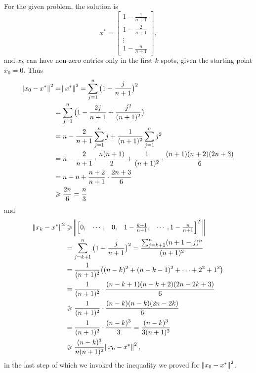 \documentclass[11pt]{article}
\begin{document}
\section{}
For the given problem, the solution is 
$$x^* = \begin{bmatrix}1-\frac1{n+1} \\ 1-\frac2{n+1} \\ \vdots \\ 1-\frac n{n+1}\end{bmatrix},$$
and $x_k$ can have non-zero entries only in the first $k$ spots, given the starting point $x_0 = 0$.
Thus
\begin{equation}\begin{split} 
\norm{x_0-x^*}^2 &= \norm{x^*}^2 = \sum_{j=1}^n\big(1 - \frac j{n+1} \big)^2 \\ 
&= \sum_{j=1}^n \big( 1 - \frac{2j}{n+1} + \frac{j^2}{(n+1)^2} \big) \\
&= n - \frac2{n+1}\sum_{j=1}^n j + \frac1{(n+1)^2}\sum_{j=1}^n j^2 \\
&= n - \frac2{n+1}\cdot \frac{n(n+1)}2 + \frac1{(n+1)^2}\cdot \frac{(n+1)(n+2)(2n+3)}6 \\
&= n - n + \frac{n+2}{n+1}\cdot\frac{2n+3}6 \\
&\geqslant \frac{2n}6 = \frac{n}3
\end{split}\nonumber\end{equation}  
and
\begin{equation}\begin{split} 
\norm{x_k-x^*}^2 &\geqslant \norm{\begin{bmatrix}0, & \cdots, & 0, & 1 - \frac{k+1}{n+1}, & \cdots, 1-\frac n{n+1} \end{bmatrix}^T } \\
&= \sum_{j=k+1}^n \big(1-\frac j{n+1} \big)^2 = \frac{\sum_{j=k+1}^n(n+1-j)^n}{(n+1)^2} \\
&= \frac1{(n+1)^2}\big((n-k)^2+(n-k-1)^2 + \cdots + 2^2 +1^2 \big)\\
&= \frac1{(n+1)^2}\cdot \frac{(n-k+1)(n-k+2)(2n-2k+3)}6 \\
&\geqslant \frac1{(n+1)^2}\cdot\frac{(n-k)(n-k)(2n-2k)}6 \\
&= \frac1{(n+1)^2}\cdot\frac{(n-k)^3}3 = \frac{(n-k)^3}{3(n+1)^2} \\
&\geqslant \frac{(n-k)^3}{n(n+1)^2}\norm{x_0-x^*}^2,
\end{split}\nonumber\end{equation}
in the last step of which we invoked the inequality we proved for $\norm{x_0-x^*}^2$.
\end{document}
